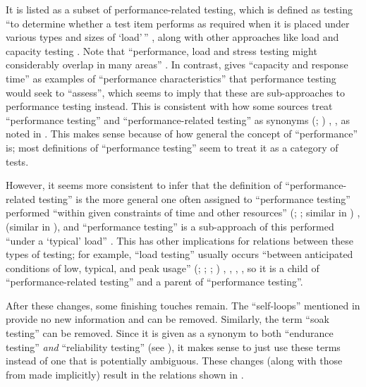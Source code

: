It is listed as a subset of performance-related testing, which is defined as
testing ``to determine whether a test item performs as required when it is
placed under various types and sizes of `load'\,'' \citeyearpar[p.~38]{IEEE2021},
along with other approaches like load and capacity testing
\citep[p.~22]{IEEE2022}. Note that ``performance, load and stress testing might
considerably overlap in many areas'' \citep[p.~1187]{Moghadam2019}.
In contrast, \citet[p.~5-9]{SWEBOK2024}
gives ``capacity and response time'' as examples of ``performance
characteristics'' that performance testing would seek to ``assess'', which
seems to imply that these are sub-approaches to performance testing instead.
This is consistent with how some sources treat ``performance testing'' and
``performance-related testing'' as synonyms \ifnotpaper
    (\citealp[p.~5-9]{SWEBOK2024}; \citealp[p.~1187]{Moghadam2019})%
\else \cite[p.~5-9]{SWEBOK2024}, \cite[p.~1187]{Moghadam2019}%
\fi, as noted in . This makes sense because of how general the
concept of ``performance'' is; most definitions of ``performance testing'' seem
to treat it as a category of tests.

However, it seems more consistent to infer
that the definition of ``performance-related testing'' is the more general one
often assigned to ``performance testing'' performed ``within given constraints
of time and other resources'' \ifnotpaper (\citealp[p.~7]{IEEE2022};
    \citeyear[p.~320]{IEEE2017}; similar in \citealp[p.~1187]{Moghadam2019})%
\else \cite[p.~320]{IEEE2017}, \cite[p.~7]{IEEE2022}
    (similar in \cite[p.~1187]{Moghadam2019})\fi, and
``performance testing'' is a sub-approach of this performed ``under a `typical'
load'' \citep[p.~39]{IEEE2021}. This has other implications for relations
between these types of testing; for example, ``load testing'' usually occurs
``between anticipated conditions of low, typical, and peak usage''
\ifnotpaper (\citealp[p.~5]{IEEE2022}; \citeyear[p.~39]{IEEE2021};
    \citeyear[p.~253]{IEEE2017}; \citealpISTQB{})%
\else \cite[p.~253]{IEEE2017}, \cite{ISTQB}, \cite[p.~5]{IEEE2022},
    \cite[p.~39]{IEEE2021}\fi, so it is a child of ``performance-related
testing'' and a parent of ``performance testing''.

After these changes, some finishing touches remain. The ``self-loops''
mentioned in  provide no new information and can be removed.
Similarly, the term ``soak testing'' can be removed. Since it is given as a
synonym to both ``endurance testing'' \emph{and} ``reliability testing'' (see
), it makes sense to just use these terms instead of one that
is potentially ambiguous. These changes (along with those from
 made implicitly) result in
the relations shown in .
